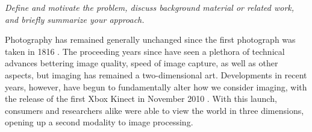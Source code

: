 
\textit{Define and motivate the problem, discuss background material or related work, and briefly summarize your approach.}

Photography has remained generally unchanged since the first photograph was
taken in 1816 \cite{Beaumont1982_photography}. The proceeding years since have seen a plethora of
technical advances bettering image quality, speed of image capture, as well as
other aspects, but imaging has remained a two-dimensional art. Developments in
recent years, however, have begun to fundamentally alter how we consider
imaging, with the release of the first Xbox Kinect in November 2010 \cite{Alex2009_kinect}.
With this launch, consumers and researchers alike were able to view the world in
three dimensions, opening up a second modality to image processing.


